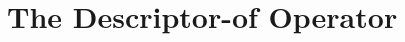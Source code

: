 %
%
%



%
%
%
%

\section{The Descriptor-of Operator}
\label{sec:Descriptor of Global Data in C}



